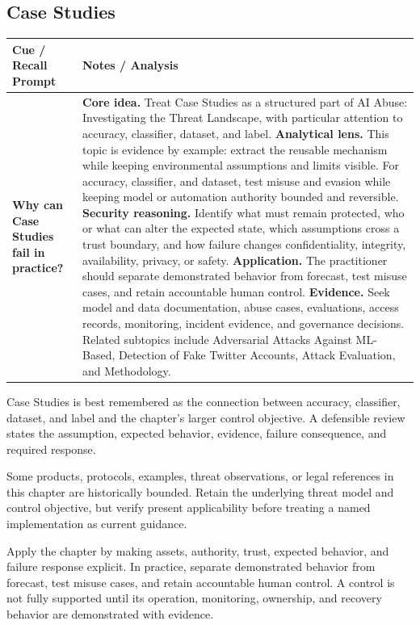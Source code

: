 \documentclass[11pt]{article}
\newcommand{\CornellHeader}{%
\rowcolor{Navy}\color{white}\bfseries Cue / Recall Prompt & \color{white}\bfseries Notes / Analysis\\\hline}
\newcommand{\CornellRow}[2]{%
\cellcolor{CueGray}\RaggedRight\textbf{#1} & \RaggedRight #2\\\hline}
\begin{document}
\subsection*{Case Studies}
\begin{longtable}{>{\RaggedRight\arraybackslash}p{}|>{\RaggedRight\arraybackslash}p{}}
\CornellHeader
\CornellRow{Why can Case Studies fail in practice?}{\textbf{Core idea.} Treat Case Studies as a structured part of AI Abuse: Investigating the Threat Landscape, with particular attention to accuracy, classifier, dataset, and label. \textbf{Analytical lens.} This topic is evidence by example: extract the reusable mechanism while keeping environmental assumptions and limits visible. For accuracy, classifier, and dataset, test misuse and evasion while keeping model or automation authority bounded and reversible. \textbf{Security reasoning.} Identify what must remain protected, who or what can alter the expected state, which assumptions cross a trust boundary, and how failure changes confidentiality, integrity, availability, privacy, or safety. \textbf{Application.} The practitioner should separate demonstrated behavior from forecast, test misuse cases, and retain accountable human control. \textbf{Evidence.} Seek model and data documentation, abuse cases, evaluations, access records, monitoring, incident evidence, and governance decisions. Related subtopics include Adversarial Attacks Against ML-Based, Detection of Fake Twitter Accounts, Attack Evaluation, and Methodology.}
\end{longtable}
\begin{topicsummary}
Case Studies is best remembered as the connection between accuracy, classifier, dataset, and label and the chapter's larger control objective. A defensible review states the assumption, expected behavior, evidence, failure consequence, and required response.
\end{topicsummary}
\begin{historybox}
Some products, protocols, examples, threat observations, or legal references in this chapter are historically bounded. Retain the underlying threat model and control objective, but verify present applicability before treating a named implementation as current guidance.
\end{historybox}
\begin{defensebox}
Apply the chapter by making assets, authority, trust, expected behavior, and failure response explicit. In practice, separate demonstrated behavior from forecast, test misuse cases, and retain accountable human control. A control is not fully supported until its operation, monitoring, ownership, and recovery behavior are demonstrated with evidence.
\end{defensebox}
\end{document}
